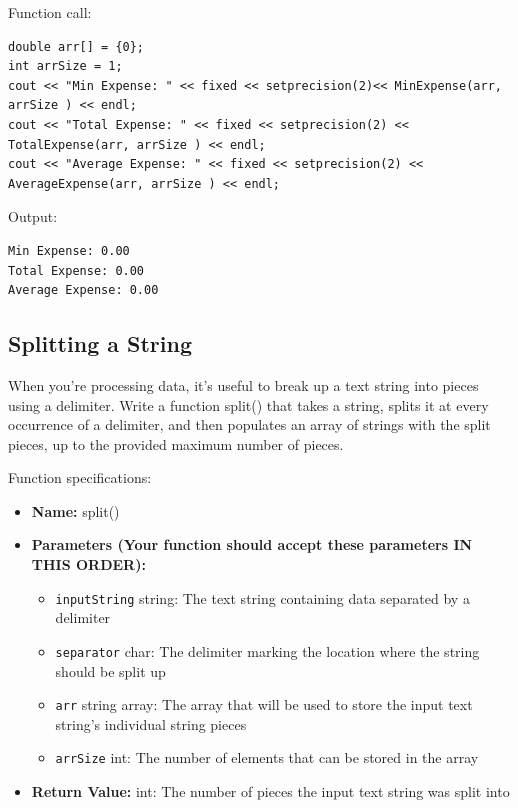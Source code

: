\begin{example}
    Function call:

\begin{verbatim}
double arr[] = {0};
int arrSize = 1;
cout << "Min Expense: " << fixed << setprecision(2)<< MinExpense(arr, arrSize ) << endl;
cout << "Total Expense: " << fixed << setprecision(2) << TotalExpense(arr, arrSize ) << endl;
cout << "Average Expense: " << fixed << setprecision(2) << AverageExpense(arr, arrSize ) << endl;
\end{verbatim}
    Output:

\begin{verbatim}
Min Expense: 0.00
Total Expense: 0.00
Average Expense: 0.00
\end{verbatim}
\end{example}

\subsection{Splitting a String}

When you're processing data, it’s useful to break up a text string into pieces using a delimiter. Write a function split() that takes a string, splits it at every occurrence of a delimiter, and then populates an array of strings with the split pieces, up to the provided maximum number of pieces.

Function specifications:

\begin{itemize}
    \item \textbf{Name:} split()
    \item \textbf{Parameters (Your function should accept these parameters IN THIS ORDER):}
    \begin{itemize}
        \item \texttt{inputString} string: The text string containing data separated by a delimiter
        \item \texttt{separator} char: The delimiter marking the location where the string should be split up
        \item \texttt{arr} string array: The array that will be used to store the input text string's individual string pieces
        \item \texttt{arrSize} int: The number of elements that can be stored in the array
    \end{itemize}
    \item \textbf{Return Value:} int: The number of pieces the input text string was split into
\end{itemize}

